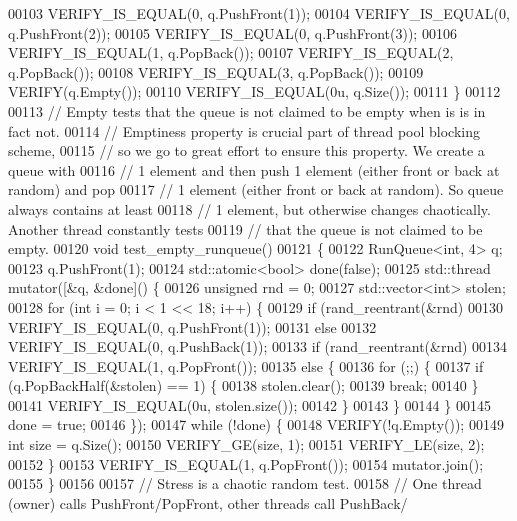 \begin{DoxyCode}
00103   VERIFY\_IS\_EQUAL(0, q.PushFront(1));
00104   VERIFY\_IS\_EQUAL(0, q.PushFront(2));
00105   VERIFY\_IS\_EQUAL(0, q.PushFront(3));
00106   VERIFY\_IS\_EQUAL(1, q.PopBack());
00107   VERIFY\_IS\_EQUAL(2, q.PopBack());
00108   VERIFY\_IS\_EQUAL(3, q.PopBack());
00109   VERIFY(q.Empty());
00110   VERIFY\_IS\_EQUAL(0u, q.Size());
00111 \}
00112 
00113 \textcolor{comment}{// Empty tests that the queue is not claimed to be empty when is is in fact not.}
00114 \textcolor{comment}{// Emptiness property is crucial part of thread pool blocking scheme,}
00115 \textcolor{comment}{// so we go to great effort to ensure this property. We create a queue with}
00116 \textcolor{comment}{// 1 element and then push 1 element (either front or back at random) and pop}
00117 \textcolor{comment}{// 1 element (either front or back at random). So queue always contains at least}
00118 \textcolor{comment}{// 1 element, but otherwise changes chaotically. Another thread constantly tests}
00119 \textcolor{comment}{// that the queue is not claimed to be empty.}
00120 \textcolor{keywordtype}{void} test\_empty\_runqueue()
00121 \{
00122   RunQueue<int, 4> q;
00123   q.PushFront(1);
00124   std::atomic<bool> done(\textcolor{keyword}{false});
00125   std::thread mutator([&q, &done]() \{
00126     \textcolor{keywordtype}{unsigned} rnd = 0;
00127     std::vector<int> stolen;
00128     \textcolor{keywordflow}{for} (\textcolor{keywordtype}{int} i = 0; i < 1 << 18; i++) \{
00129       \textcolor{keywordflow}{if} (rand\_reentrant(&rnd) %
00130         VERIFY\_IS\_EQUAL(0, q.PushFront(1));
00131       \textcolor{keywordflow}{else}
00132         VERIFY\_IS\_EQUAL(0, q.PushBack(1));
00133       \textcolor{keywordflow}{if} (rand\_reentrant(&rnd) %
00134         VERIFY\_IS\_EQUAL(1, q.PopFront());
00135       \textcolor{keywordflow}{else} \{
00136         \textcolor{keywordflow}{for} (;;) \{
00137           \textcolor{keywordflow}{if} (q.PopBackHalf(&stolen) == 1) \{
00138             stolen.clear();
00139             \textcolor{keywordflow}{break};
00140           \}
00141           VERIFY\_IS\_EQUAL(0u, stolen.size());
00142         \}
00143       \}
00144     \}
00145     done = \textcolor{keyword}{true};
00146   \});
00147   \textcolor{keywordflow}{while} (!done) \{
00148     VERIFY(!q.Empty());
00149     \textcolor{keywordtype}{int} size = q.Size();
00150     VERIFY\_GE(size, 1);
00151     VERIFY\_LE(size, 2);
00152   \}
00153   VERIFY\_IS\_EQUAL(1, q.PopFront());
00154   mutator.join();
00155 \}
00156 
00157 \textcolor{comment}{// Stress is a chaotic random test.}
00158 \textcolor{comment}{// One thread (owner) calls PushFront/PopFront, other threads call PushBack/}

\end{DoxyCode}
